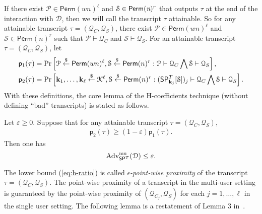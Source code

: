 If there exist ${\mathcal{P}} \in {\mathsf{Perm}}(wn)^\ell$ and $\mathcal{S} \in \mathsf{Perm}(\emph{n})^r$ that outputs $\tau$ at the end of the interaction with $\mathcal{D}$, then we will call the transcript $\tau$ attainable. So for any attainable transcript $\tau= (\mathcal{Q}_C,\mathcal{Q}_S)$, there exist ${\mathcal{P}} \in {\mathsf{Perm}}(wn)^\ell$ and $\mathcal{S} \in \mathsf{Perm}(n)^r$ such that ${\mathcal{P}}\vdash\mathcal{Q}_C$ and $\mathcal{S}\vdash\mathcal{Q}_S$. For an attainable transcript $\tau = (\mathcal{Q}_C,\mathcal{Q}_S)$, let
%
%
$$
\begin{aligned}
&\mathsf{p}_{1}(\tau)=\operatorname{Pr}\left[{\mathcal{P}} \stackrel{\$}{\leftarrow} {{\mathsf{Perm}}}(wn)^{\ell}, \mathcal{S} \stackrel{\$}{\leftarrow} \mathsf{Perm}(n)^{r}: {\mathcal{P}} \vdash \mathcal{Q}_{C} \bigwedge \mathcal{S} \vdash \mathcal{Q}_{S}\right],\\
&\mathsf{p}_{2}(\tau)=\operatorname{Pr}\left[\mathbf{k}_{1}, \ldots, \mathbf{k}_{\ell} \stackrel{\$}{\leftarrow} \mathcal{K}^{\ell}, \mathcal{S} \stackrel{\$}{\leftarrow} \mathsf{Perm}(n)^{r}:(\mathsf{SP}_{\mathbf{k}_{j}}^{T}[\mathcal{S}])_{j} \vdash \mathcal{Q}_{C} \bigwedge \mathcal{S} \vdash \mathcal{Q}_{S}\right].
\end{aligned}
$$
%
%
With these definitions, the core lemma of the H-coefficients technique (without defining ``bad'' transcripts) is stated as follows.


\begin{lemma}
	\label{lemma:h-coeff}
	
	Let $\varepsilon \geq 0$. Suppose that for any attainable transcript $\tau = (\mathcal{Q}_C,\mathcal{Q}_S)$,
	\begin{align}
	\mathsf{p}_{2}(\tau) \geq (1 - \varepsilon) \mathsf{p}_{1}(\tau).
	\label{eq:h-ratio}
	\end{align}
	Then one has
	$$
	\operatorname{Adv}^{\mathrm{mu}}_{\mathsf{SP}^T}(\mathcal{D}) \leq \varepsilon.
	$$
\end{lemma}
%
%
The lower bound (\ref{eq:h-ratio}) is called \emph{$\epsilon$-point-wise proximity} of the transcript $\tau = (\mathcal{Q}_C, \mathcal{Q}_S)$. The point-wise proximity of a transcript in the multi-user setting is guaranteed by the point-wise proximity of $(\mathcal{Q}_{C_{j}}, \mathcal{Q}_S)$ for each $j = 1, \ldots ,\ell$ in the single user setting. The following lemma is a restatement of Lemma 3 in~\cite{C:HoaTes16}.



